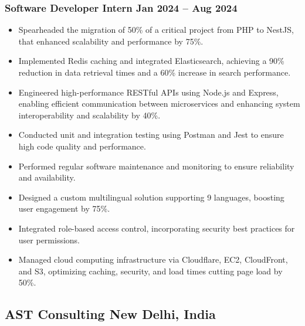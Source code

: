 \documentclass[10pt]{article}
\newcommand{\rside}[1]{
  \hfill {\normalfont\color{accent} #1}%
}
\begin{document}
\subsubsection{Software Developer Intern \rside{Jan 2024 -- Aug 2024}}
\begin{itemize}
    \item Spearheaded the migration of 50\% of a critical project from PHP to NestJS, that enhanced scalability and performance by 75\%.
    \item Implemented Redis caching and integrated Elasticsearch, achieving a 90\% reduction in data retrieval times and a 60\% increase in search performance.
    \item Engineered high-performance RESTful APIs using Node.js and Express, enabling efficient communication between microservices and enhancing system interoperability and scalability by 40\%.
    \item Conducted unit and integration testing using Postman and Jest to ensure high code quality and performance.
    \item Performed regular software maintenance and monitoring to ensure reliability and availability.
    \item Designed a custom multilingual solution supporting 9 languages, boosting user engagement by 75\%.
    \item Integrated role-based access control, incorporating security best practices for user permissions.
    \item Managed cloud computing infrastructure via Cloudflare, EC2, CloudFront, and S3, optimizing caching, security, and load times cutting page load by 50\%.
\end{itemize}

\subsection{AST Consulting \rside{New Delhi, India}}
\end{document}
